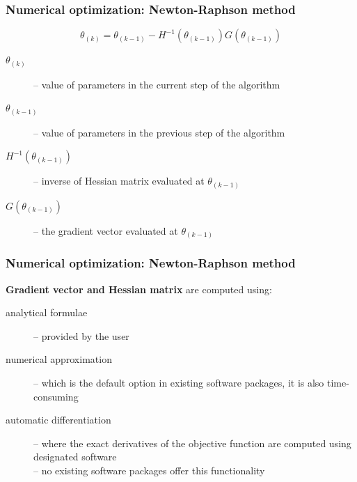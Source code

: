 \documentclass[notes,blackandwhite,mathsans]{beamer}
\begin{document}
\begin{frame}
\frametitle{Numerical optimization: Newton-Raphson method}

\vspace{1cm}
$$ \theta_{(k)} = \theta_{(k-1)} - H^{-1}\left(\theta_{(k-1)}\right)G\left(\theta_{(k-1)}\right) $$

\bigskip\begin{description}
\item[$\theta_{(k)}$] {\color{mcxs2}-- value of parameters in the current step of the algorithm}
\item[$\theta_{(k-1)}$] {\color{mcxs2}-- value of parameters in the previous step of the algorithm}
\item[$H^{-1}\left(\theta_{(k-1)}\right)$] {\color{mcxs2}-- inverse of Hessian matrix evaluated at} $\theta_{(k-1)}$
\item[$G\left(\theta_{(k-1)}\right)$] {\color{mcxs2}-- the gradient vector evaluated at} $\theta_{(k-1)}$
\end{description}

\end{frame}





\begin{frame}
\frametitle{Numerical optimization: Newton-Raphson method}

\textbf{Gradient vector and Hessian matrix} {\color{mcxs2}are computed using:}
\bigskip\begin{description}
\item[analytical formulae] {\color{mcxs2}-- provided by the user}
\item[numerical approximation] {\color{mcxs2}-- which is the default option in existing software packages, it is also time-consuming}
\item[automatic differentiation] {\color{mcxs2}-- where the exact derivatives of the objective function are computed using designated software\\ -- no existing software packages offer this functionality}
\end{description}

\end{frame}
\end{document}
